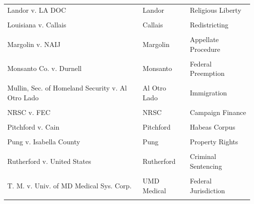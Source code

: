 \documentclass[
  12pt,
]{article}
\begin{document}
\begin{longtable}[t]{>{\raggedright\arraybackslash}p{5in}>{\centering\arraybackslash}p{3in}>{\centering\arraybackslash}p{3in}}
Landor v. LA DOC & Landor & Religious Liberty\\
\cellcolor{gray!10}{Learning Resources, Inc. v. Trump, President of U.S.} & \cellcolor{gray!10}{Learning Resources} & \cellcolor{gray!10}{Presidential Power}\\
Louisiana v. Callais & Callais & Redistricting\\
\cellcolor{gray!10}{M \& K Employee Solutions v. Trustees of the IAM Pension Fund} & \cellcolor{gray!10}{IAM Pension Fund} & \cellcolor{gray!10}{ERISA}\\
Margolin v. NAIJ & Margolin & Appellate Procedure\\
\cellcolor{gray!10}{McCarthy v. Hernandez} & \cellcolor{gray!10}{McCarthy} & \cellcolor{gray!10}{Habeas Corpus}\\
Monsanto Co. v. Durnell & Monsanto & Federal Preemption\\
\cellcolor{gray!10}{Montgomery v. Caribe Transport II, LLC} & \cellcolor{gray!10}{Montgomery} & \cellcolor{gray!10}{Federal Preemption}\\
Mullin, Sec. of Homeland Security v. Al Otro Lado & Al Otro Lado & Immigration\\
\cellcolor{gray!10}{Mullin, Sec. of Homeland Security v. Doe} & \cellcolor{gray!10}{Mullin v. Doe} & \cellcolor{gray!10}{Immigration}\\
NRSC v. FEC & NRSC & Campaign Finance\\
\cellcolor{gray!10}{Olivier v. City of Brandon} & \cellcolor{gray!10}{Olivier} & \cellcolor{gray!10}{Civil Rights}\\
Pitchford v. Cain & Pitchford & Habeas Corpus\\
\cellcolor{gray!10}{Pitts v. Mississippi} & \cellcolor{gray!10}{Pitts} & \cellcolor{gray!10}{Confrontation Clause}\\
Pung v. Isabella County & Pung & Property Rights\\
\cellcolor{gray!10}{Rico v. United States} & \cellcolor{gray!10}{Rico} & \cellcolor{gray!10}{Criminal Sentencing}\\
Rutherford v. United States & Rutherford & Criminal Sentencing\\
\cellcolor{gray!10}{Sripetch v. SEC} & \cellcolor{gray!10}{Sripetch} & \cellcolor{gray!10}{Securities Law}\\
T. M. v. Univ. of MD Medical Sys. Corp. & UMD Medical & Federal Jurisdiction\\
\cellcolor{gray!10}{Trump v. Barbara} & \cellcolor{gray!10}{Barbara} & \cellcolor{gray!10}{Citizenship}\\

\end{longtable}
\end{document}
